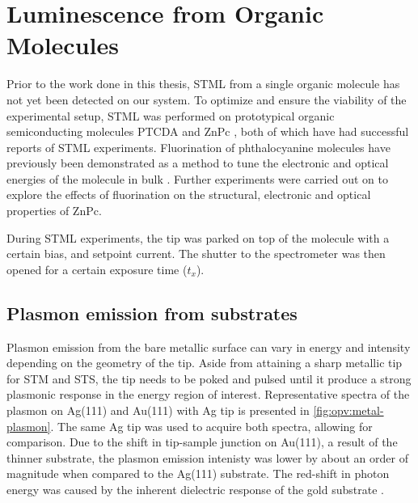 
\chapter{Luminescence from Organic Molecules}
\label{ch:opv}

Prior to the work done in this thesis, \ac{STML} from a single organic molecule has not yet been detected on our system. To optimize and ensure the viability of the experimental setup, \ac{STML} was performed on prototypical organic semiconducting molecules \ac{PTCDA} \citep{Rzeznicka2011, Kimura2019} and \ac{ZnPc} \citep{Zhang2016, Doppagne2017, Zhang2017, Imada2016, Doppagne2018, Miwa2019}, both of which have had successful reports of \ac{STML} experiments. Fluorination of phthalocyanine molecules have previously been demonstrated as a method to tune the electronic and optical energies of the molecule in bulk \citep{schwarze2016band, warren2019controlling}. Further experiments were carried out on  to explore the effects of fluorination on the structural, electronic and optical properties of ZnPc.

During \ac{STML} experiments, the tip was parked on top of the molecule with a certain bias, and setpoint current. The shutter to the spectrometer was then opened for a certain exposure time ($t_x$).

\section{Plasmon emission from substrates}

Plasmon emission from the bare metallic surface can vary in energy and intensity depending on the geometry of the tip. Aside from attaining a sharp metallic tip for \ac{STM} and \ac{STS}, the tip needs to be poked and pulsed until it produce a strong plasmonic response in the energy region of interest. Representative spectra of the plasmon on Ag(111) and Au(111) with Ag tip is presented in \autoref{fig:opv:metal-plasmon}. The same Ag tip was used to acquire both spectra, allowing for comparison. Due to the shift in tip-sample junction on Au(111), a result of the thinner substrate, the plasmon emission intenisty was lower by about an order of magnitude when compared to the Ag(111) substrate. The red-shift in photon energy was caused by the inherent dielectric response of the gold substrate \citep{olmon2012optical, yang2015optical}. 


